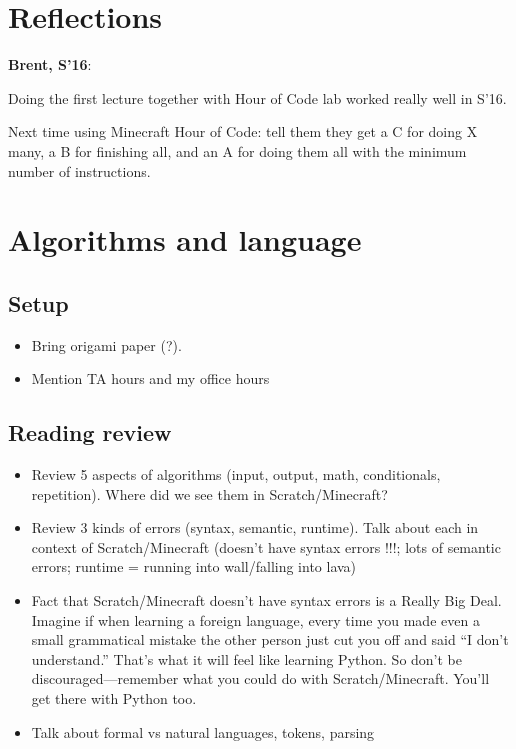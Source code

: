 \documentclass{article}
\newenvironment{reflect}[1]
{
  \begin{lrbox}{\reflectbox}
    \begin{minipage}[t]{\textwidth}
      \textbf{#1}:
}{
    \end{minipage}
  \end{lrbox}
  \fbox{\usebox{\reflectbox}}
}
\begin{document}
\section*{Reflections}

\begin{reflect}{Brent, S'16}
  Doing the first lecture together with Hour of Code lab worked really
  well in S'16.

  Next time using Minecraft Hour of Code: tell them they get a C for
  doing X many, a B for finishing all, and an A for doing them all
  with the minimum number of instructions.
\end{reflect}

\newpage

\section{Algorithms and language}

\subsection*{Setup}

\begin{itemize}
\item Bring origami paper (?).
\item Mention TA hours and my office hours
\end{itemize}

\subsection*{Reading review}

\begin{itemize}
\item Review 5 aspects of algorithms (input, output, math,
  conditionals, repetition).  Where did we see them in
  Scratch/Minecraft?
\item Review 3 kinds of errors (syntax, semantic, runtime).  Talk
  about each in context of Scratch/Minecraft (doesn't have syntax
  errors !!!; lots of semantic errors; runtime = running into
  wall/falling into lava)
\item Fact that Scratch/Minecraft doesn't have syntax errors is a
  Really Big Deal.  Imagine if when learning a foreign language, every
  time you made even a small grammatical mistake the other person just
  cut you off and said ``I don't understand.''  That's what it will
  feel like learning Python.  So don't be discouraged---remember what
  you could do with Scratch/Minecraft.  You'll get there with Python
  too.
\item Talk about formal vs natural languages, tokens, parsing
\end{itemize}
\end{document}
